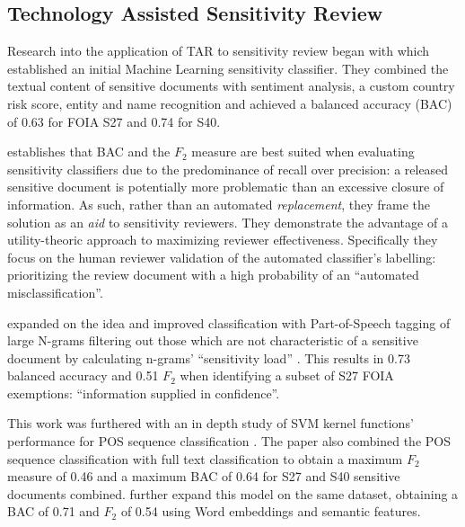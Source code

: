 \documentclass[\version]{l4proj}
\begin{document}
\subsection{Technology Assisted Sensitivity Review}

\autocite{sanchezDetectingSensitiveInformation2012}

Research into the application of TAR to sensitivity review began with \textcite{mcdonaldClassifierDigitalSensitivity2014} which established an initial Machine Learning sensitivity classifier.
They combined the textual content of sensitive documents with sentiment analysis, a custom country risk score, entity and name recognition and achieved a balanced accuracy (BAC) of 0.63 for FOIA S27 and 0.74 for S40.

\textcite{berardiSemiAutomatedTextClassification2015} establishes that BAC and the \(F_{2}\) measure are best suited when evaluating sensitivity classifiers due to the predominance of recall over precision: a released sensitive document is potentially more problematic than an excessive closure of information.
As such, rather than an automated \textit{replacement}, they frame the solution as an \textit{aid} to sensitivity reviewers.
They demonstrate the advantage of a utility-theoric approach to maximizing reviewer effectiveness.
Specifically they focus on the human reviewer validation of the automated classifier's labelling: prioritizing the review document with a high probability of an ``automated misclassification''.

\textcite{mcdonaldUsingPartofSpeechNgrams2015} expanded on the idea and improved classification with Part-of-Speech tagging of large N-grams filtering out those which are not characteristic of a sensitive document by calculating n-grams' ``sensitivity load'' \autocite[2]{mcdonaldUsingPartofSpeechNgrams2015}.
This results in 0.73 balanced accuracy and 0.51 \(F_{2}\) when identifying a subset of S27 FOIA exemptions: ``information supplied in confidence''.

This work was furthered with an in depth study of SVM kernel functions' performance for POS sequence classification \autocite{mcdonaldStudySVMKernel2017}.
The paper also combined the POS sequence classification with full text classification to obtain a maximum \(F_{2}\) measure of 0.46 and a maximum BAC of 0.64 for S27 and S40 sensitive documents combined.
\autocite{mcdonaldEnhancingSensitivityClassification2017} further expand this model on the same dataset, obtaining a BAC of 0.71 and \(F_{2}\) of 0.54 using Word embeddings and semantic features.
\end{document}
